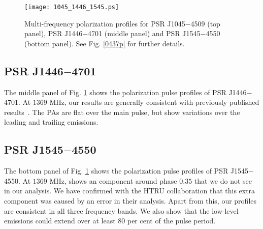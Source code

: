 \documentclass[useAMS,usenatbib]{mn2e}
\begin{document}

\begin{figure}
\begin{center}
\texttt{[image: 1045\_1446\_1545.ps]}
\caption{Multi-frequency polarization profiles for PSR J1045$-$4509 (top 
panel), PSR J1446$-$4701 (middle panel) and PSR J1545$-$4550 (bottom panel). 
See Fig. \ref{0437p} for further details.}
\label{1045p}
\end{center}
\end{figure}

\subsection{PSR J1446$-$4701}

The middle panel of Fig. \ref{1045p} shows the polarization pulse profiles of 
PSR J1446$-$4701.
%
At $1369$ MHz, our results are generally consistent with previously published
results~\citep{Keith12}.
%
The PAs are flat over the main pulse, but show variations over the leading and 
trailing emissions.
%

\subsection{PSR J1545$-$4550}

The bottom panel of Fig. \ref{1045p} shows the polarization pulse profiles of 
PSR J1545$-$4550.
%
At $1369$ MHz, \citet{Burgay13} shows an component around phase $0.35$ that 
we do not see in our analysis. We have confirmed with the HTRU collaboration 
that this extra component was caused by an error in their analysis.  
%
Apart from this, our profiles are consistent in all three frequency bands.
%
We also show that the low-level emissions could extend over at least $80$ 
per cent of the pulse period.
\end{document}
